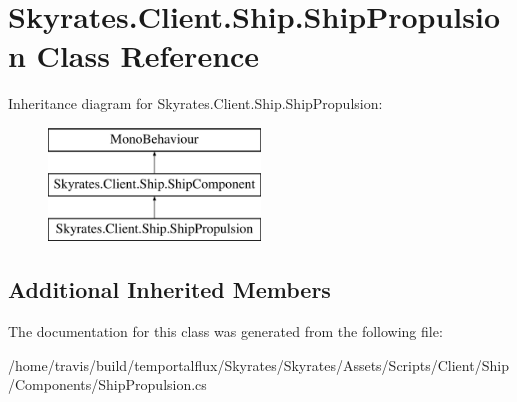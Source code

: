\hypertarget{class_skyrates_1_1_client_1_1_ship_1_1_ship_propulsion}{\section{Skyrates.\-Client.\-Ship.\-Ship\-Propulsion Class Reference}
\label{class_skyrates_1_1_client_1_1_ship_1_1_ship_propulsion}
}
Inheritance diagram for Skyrates.\-Client.\-Ship.\-Ship\-Propulsion\-:\begin{figure}[H]
\begin{center}
\leavevmode
\includegraphics[height=3.000000cm]{class_skyrates_1_1_client_1_1_ship_1_1_ship_propulsion}
\end{center}
\end{figure}
\subsection*{Additional Inherited Members}


The documentation for this class was generated from the following file\-:\begin{DoxyCompactItemize}
\item 
/home/travis/build/temportalflux/\-Skyrates/\-Skyrates/\-Assets/\-Scripts/\-Client/\-Ship/\-Components/Ship\-Propulsion.\-cs\end{DoxyCompactItemize}
